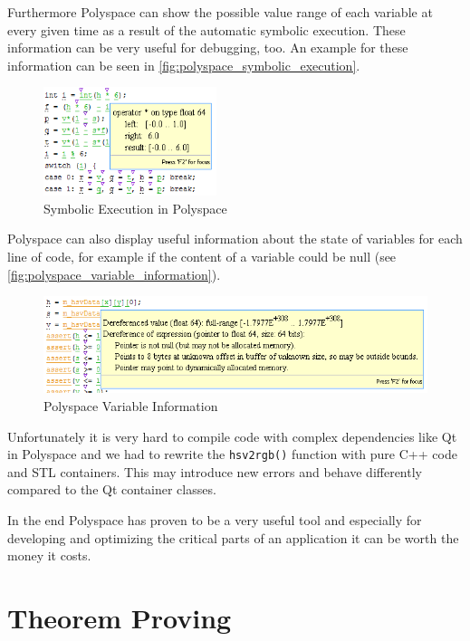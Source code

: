 \documentclass{scrreprt}
\begin{document}
Furthermore Polyspace can show the possible value range of each variable at every given time as a result of the automatic symbolic execution. These information can be very useful for debugging, too. An example for these information can be seen in \vref{fig:polyspace_symbolic_execution}.

\begin{figure}[h]
	\centering
	\includegraphics[width=0.45\textwidth]{img/polyspace_symbolic_execution}
	\caption[Symbolic Execution in Polyspace]{Symbolic Execution in Polyspace}
	\label{fig:polyspace_symbolic_execution}
\end{figure}

Polyspace can also display useful information about the state of variables for each line of code, for example if the content of a variable could be null (see \vref{fig:polyspace_variable_information}).

\begin{figure}[h]
	\centering
	\includegraphics[width=1.0\textwidth]{img/polyspace_variable_information}
	\caption[Polyspace Variable Information]{Polyspace Variable Information}
	\label{fig:polyspace_variable_information}
\end{figure}

Unfortunately it is very hard to compile code with complex dependencies like Qt in Polyspace and we had to rewrite the \texttt{hsv2rgb()} function with pure C++ code and STL containers. This may introduce new errors and behave differently compared to the Qt container classes.

In the end Polyspace has proven to be a very useful tool and especially for developing and optimizing the critical parts of an application it can be worth the money it costs.

\section{Theorem Proving}
\end{document}
